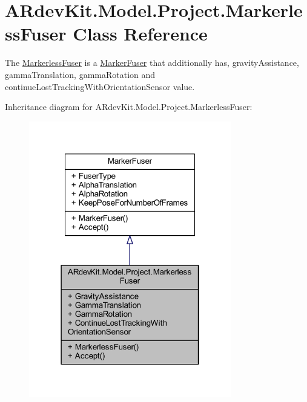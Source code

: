 \hypertarget{class_a_rdev_kit_1_1_model_1_1_project_1_1_markerless_fuser}{\section{A\-Rdev\-Kit.\-Model.\-Project.\-Markerless\-Fuser Class Reference}
\label{class_a_rdev_kit_1_1_model_1_1_project_1_1_markerless_fuser}
}


The \hyperlink{class_a_rdev_kit_1_1_model_1_1_project_1_1_markerless_fuser}{Markerless\-Fuser} is a \hyperlink{class_a_rdev_kit_1_1_model_1_1_project_1_1_marker_fuser}{Marker\-Fuser} that additionally has, gravity\-Assistance, gamma\-Translation, gamma\-Rotation and continue\-Lost\-Tracking\-With\-Orientation\-Sensor value.  




Inheritance diagram for A\-Rdev\-Kit.\-Model.\-Project.\-Markerless\-Fuser\-:
\nopagebreak
\begin{figure}[H]
\begin{center}
\leavevmode
\includegraphics[width=250pt]{class_a_rdev_kit_1_1_model_1_1_project_1_1_markerless_fuser__inherit__graph}
\end{center}
\end{figure}



